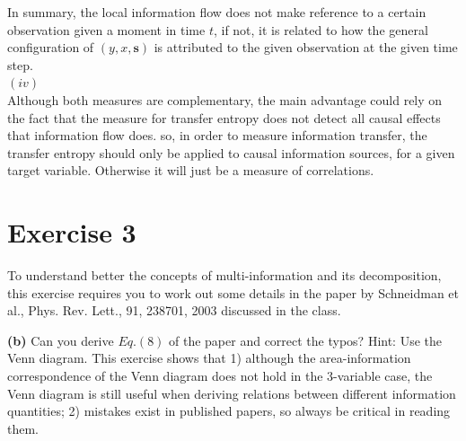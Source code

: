 \documentclass[11pt]{article}
\begin{document}
In summary, the local information flow does not make reference to a certain observation given a moment in time  $t$, if not, it is related to how the general configuration of $(y, x, \boldsymbol{s})$ is attributed to the given observation at the given time step.\\

$(iv)$\\

Although both measures are complementary, the main advantage could rely on the fact that the measure for transfer entropy does not detect all causal effects that information flow does. so, in order to measure information transfer, the transfer entropy should only be applied to causal information sources, for a given target variable. Otherwise it will just be a measure of correlations.

\pagebreak
\section{Exercise 3}

To understand better the concepts of multi-information and its decomposition, this exercise requires you to work out some details in the paper by Schneidman et al., Phys. Rev. Lett., 91, 238701, 2003 discussed in the class.\\
	

\begin{tcolorbox}
\textbf{(b)}
Can you derive $Eq. (8)$ of the paper and correct the typos? Hint: Use the
Venn diagram. This exercise shows that 1) although the area-information
correspondence of the Venn diagram does not hold in the 3-variable case, the Venn
diagram is still useful when deriving relations between different information
quantities; 2) mistakes exist in published papers, so always be critical in reading them.\\
\end{tcolorbox}
\end{document}
